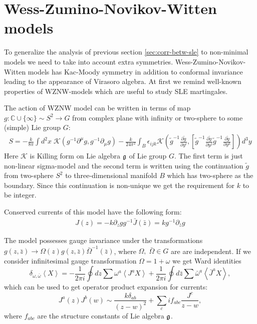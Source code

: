 \section{Wess-Zumino-Novikov-Witten models}
\label{sec:sle-wzw-models}
To generalize the analysis of previous section \ref{sec:corr-betw-sle} to non-minimal models we need to take into account extra symmetries. Wess-Zumino-Novikov-Witten models has Kac-Moody symmetry in addition to conformal invariance leading to the appearance of Virasoro algebra. At first we remind well-known properties of WZNW-models \cite{difrancesco1997cft} which are useful to study SLE martingales. 

 The action of WZNW model can be written in terms of map $g:\mathbb{C}\cup \{\infty\}\sim S^{2}\to G$ from complex plane with infinity or two-sphere to some (simple) Lie group $G$:
\begin{multline}
  S=-\frac{k}{8\pi}\int d^2x\; \mathcal{K} (g^{-1}\partial^{\mu}g, g^{-1} \partial_{\mu}g)  
  - \frac{k }{24\pi^{2}} \int_{B}\epsilon_{ijk} \mathcal{K}\left(
    \tilde g^{-1}\frac{\partial \tilde g}{\partial y^i},\left[
      \tilde g^{-1}\frac{\partial \tilde g}{\partial y^j}
      \tilde g^{-1}\frac{\partial \tilde g}{\partial y^k}\right]\right) d^3y
\end{multline}
 Here $\mathcal{K}$ is Killing form on Lie algebra $\mathfrak{g}$ of Lie group $G$. The first term is just non-linear sigma-model and the second term is written using the continuation $\tilde{g}$ from two-sphere $S^{2}$ to three-dimensional manifold $B$ which has two-sphere as the boundary. Since this continuation is non-unique we get the requirement for $k$ to be integer. 

Conserved currents of this model have the following form:
  \begin{eqnarray}
    J(z)= -k \partial_zg g^{-1}
    \bar J(\bar z)=k g^{-1}\partial_{\bar z}g
  \end{eqnarray}

The model possesses gauge invariance under the transformations
  $g(z,\bar z)\to \Omega(z)g(z,\bar z)\bar \Omega^{-1}(\bar z)$, 
where $\Omega,\;\bar \Omega \in G$ are are independent. If we consider infinitesimal gauge transformation $\Omega=1+\omega$ we get Ward identities 
  \begin{equation}
    \label{eq:87}
    \delta_{\omega,\bar \omega}\left< X \right>=-\frac{1}{2\pi i}\oint dz \sum\omega^a \left< J^a X\right>+
    \frac{1}{2\pi i} \oint d\bar z \sum \bar \omega^a \left< \bar J^a X\right>,
  \end{equation}
which can be used to get operator product expansion for currents:
 \begin{equation}
   \label{eq:3}
   J^{a}(z)J^{b}(w)\sim \frac{k\delta_{ab}}{(z-w)^{2}}+\sum_{c}i f_{abc}\frac{J^{c}}{z-w},
 \end{equation}
where $f_{abc}$ are the structure constants of Lie algebra $\mathfrak{g}$.
 
